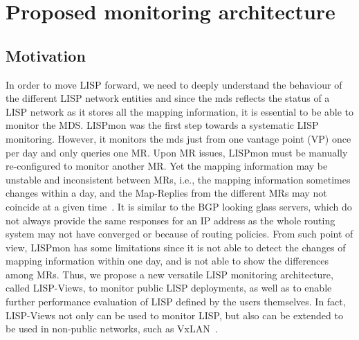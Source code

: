 \section{Proposed monitoring architecture}
\label{sec:lispviews_archi}

\subsection{Motivation}
\label{sec:lispviews_archi_motivation}

In order to move LISP forward, we need to deeply understand the behaviour of the different LISP network entities and since the \acrshort{mds} reflects the status of a LISP network as it stores all the mapping information, it is essential to be able to monitor the MDS. LISPmon was the first step towards a systematic LISP monitoring. However, it monitors the \acrshort{mds} just from one vantage point (VP) once per day and only queries one MR. Upon MR issues, LISPmon must be manually re-configured to  monitor another MR. Yet the mapping information may be unstable and inconsistent between MRs, i.e., the mapping information sometimes changes within a day, and the Map-Replies from the different MRs may not coincide at a given time~\cite{yue2016stability}. It is similar to the BGP looking glass servers, which do not always provide the same responses for an IP address as the whole routing system may not have converged or because of routing policies. From such point of view, LISPmon has some limitations since it is not able to detect the changes of mapping information within one day, and is not able to show the differences among MRs. Thus, we propose a new versatile LISP monitoring architecture, called LISP-Views, to monitor public LISP deployments, as well as to enable further performance evaluation of LISP defined by the users themselves. In fact, LISP-Views not only can be used to monitor LISP, but also can be extended to be used in non-public networks, such as VxLAN~\cite{mahalingam2014virtual}.

